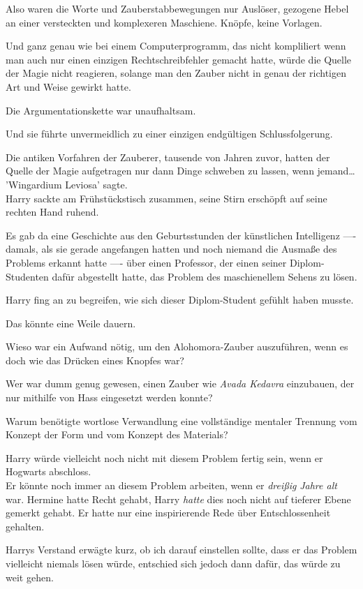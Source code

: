 {Also waren die Worte und Zauberstabbewegungen nur Auslöser, gezogene Hebel an einer versteckten und komplexeren Maschiene. Knöpfe, keine Vorlagen.

Und ganz genau wie bei einem Computerprogramm, das nicht kompliliert wenn man auch nur einen einzigen Rechtschreibfehler gemacht hatte, würde die Quelle der Magie nicht reagieren, solange man den Zauber nicht in genau der richtigen Art und Weise gewirkt hatte.

Die Argumentationskette war unaufhaltsam.

Und sie führte unvermeidlich zu einer einzigen endgültigen Schlussfolgerung.

Die antiken Vorfahren der Zauberer, tausende von Jahren zuvor, hatten der Quelle der Magie aufgetragen nur dann Dinge schweben zu lassen, wenn jemand…\\ 'Wingardium Leviosa' sagte.\\ Harry sackte am Frühstückstisch zusammen, seine Stirn erschöpft auf seine rechten Hand ruhend.

Es gab da eine Geschichte aus den Geburtsstunden der künstlichen Intelligenz ---- damals, als sie gerade angefangen hatten und noch niemand die Ausmaße des Problems erkannt hatte ---- über einen Professor, der einen seiner Diplom-Studenten dafür abgestellt hatte, das Problem des maschienellem Sehens zu lösen.

Harry fing an zu begreifen, wie sich dieser Diplom-Student gefühlt haben musste.

Das könnte eine Weile dauern.

Wieso war ein Aufwand nötig, um den Alohomora-Zauber auszuführen, wenn es doch wie das Drücken eines Knopfes war?

Wer war dumm genug gewesen, einen Zauber wie \emph{Avada Kedavra} einzubauen, der nur mithilfe von Hass eingesetzt werden konnte?

Warum benötigte wortlose Verwandlung eine vollständige mentaler Trennung vom Konzept der Form und vom Konzept des Materials?

Harry würde vielleicht noch nicht mit diesem Problem fertig sein, wenn er Hogwarts abschloss.\\ Er könnte noch immer an diesem Problem arbeiten, wenn er \emph{dreißig} \emph{Jahre alt} war. Hermine hatte Recht gehabt, Harry \emph{hatte} dies noch nicht auf tieferer Ebene gemerkt gehabt. Er hatte nur eine inspirierende Rede über Entschlossenheit gehalten.

Harrys Verstand erwägte kurz, ob ich darauf einstellen sollte, dass er das Problem vielleicht niemals lösen würde, entschied sich jedoch dann dafür, das würde zu weit gehen.

}
